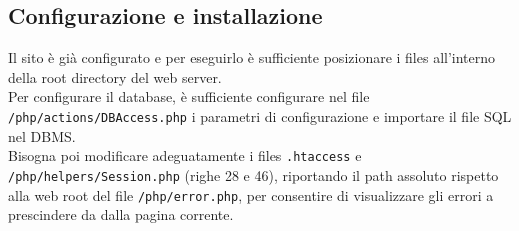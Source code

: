     \subsection{Configurazione e installazione}
    Il sito è già configurato e per eseguirlo è sufficiente posizionare i files all'interno della root directory del web server.\\
    Per configurare il database, è sufficiente configurare nel file \texttt{/php/actions/DBAccess.php} i parametri di configurazione e importare il file SQL nel DBMS.\\
    Bisogna poi modificare adeguatamente i files \texttt{.htaccess} e \texttt{/php/helpers/Session.php} (righe 28 e 46), riportando il path assoluto rispetto alla web root del file \texttt{/php/error.php}, per consentire di visualizzare gli errori a prescindere da dalla pagina corrente.